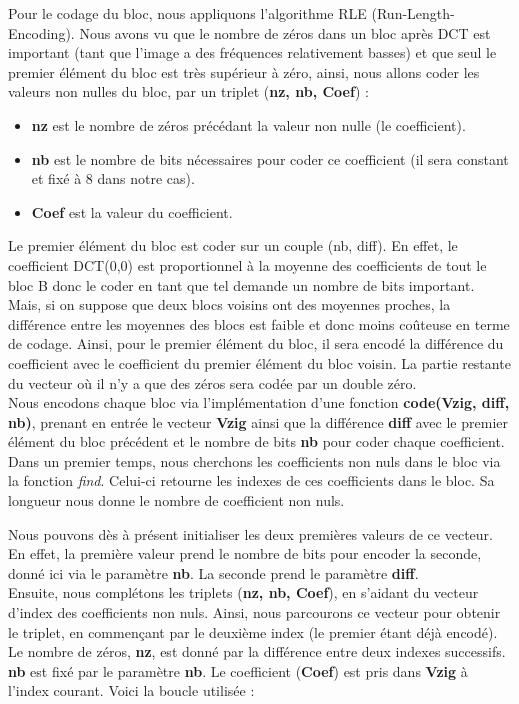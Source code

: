 \documentclass[a4paper, 12pt]{article}
\begin{document}
Pour le codage du bloc, nous appliquons l'algorithme RLE (Run-Length-Encoding). Nous avons vu que le nombre de zéros dans un bloc après DCT est important (tant que l'image a des fréquences relativement basses) et que seul le premier élément du bloc est très supérieur à zéro, ainsi, nous allons coder les valeurs non nulles du bloc, par un triplet (\textbf{nz, nb, Coef}) :
\begin{itemize}
	\item \textbf{nz} est le nombre de zéros précédant la valeur non nulle (le coefficient).
	\item \textbf{nb} est le nombre de bits nécessaires pour coder ce coefficient (il sera constant et fixé à 8 dans notre cas).
	\item \textbf{Coef} est la valeur du coefficient.
\end{itemize}
Le premier élément du bloc est coder sur un couple (nb, diff). En effet, le coefficient DCT(0,0) est proportionnel à la moyenne des coefficients de tout le bloc B donc le coder en tant que tel demande un nombre de bits important. Mais, si on suppose que deux blocs voisins ont des moyennes proches, la différence entre les moyennes des blocs est faible et donc moins coûteuse en terme de codage. Ainsi, pour le premier élément du bloc, il sera encodé la différence du coefficient avec le coefficient du premier élément du bloc voisin. La partie restante du vecteur où il n’y a que des zéros sera codée par un double zéro. \\

Nous encodons chaque bloc via l'implémentation d'une fonction \textbf{code(Vzig, diff, nb)}, prenant en entrée le vecteur \textbf{Vzig} ainsi que la différence \textbf{diff} avec le premier élément du bloc précédent et le nombre de bits \textbf{nb} pour coder chaque coefficient.\\

Dans un premier temps, nous cherchons les coefficients non nuls dans le bloc via la fonction \textit{find}. Celui-ci retourne les indexes de ces coefficients dans le bloc. Sa longueur nous donne le nombre de coefficient non nuls.

Nous pouvons dès à présent initialiser les deux premières valeurs de ce vecteur. En effet, la première valeur prend le nombre de bits pour encoder la seconde, donné ici via le paramètre \textbf{nb}. La seconde prend le paramètre \textbf{diff}. \\

Ensuite, nous complétons les triplets (\textbf{nz, nb, Coef}), en s'aidant du vecteur d'index des coefficients non nuls.
Ainsi, nous parcourons ce vecteur pour obtenir le triplet, en commençant par le deuxième index (le premier étant déjà encodé). Le nombre de zéros, \textbf{nz}, est donné par la différence entre deux indexes successifs. \textbf{nb} est fixé par le paramètre \textbf{nb}. Le coefficient (\textbf{Coef}) est pris dans \textbf{Vzig} à l'index courant. Voici la boucle utilisée :
\end{document}
